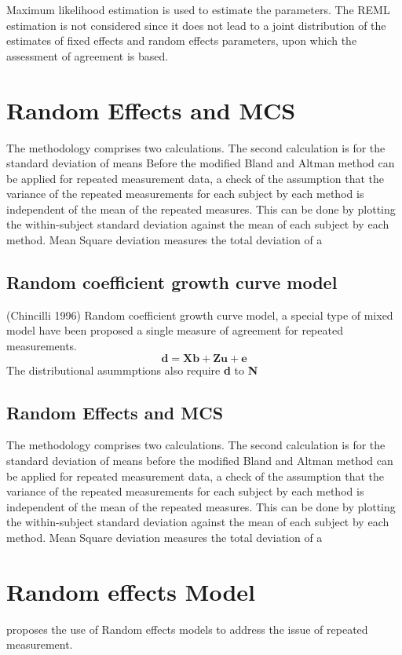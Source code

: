 \documentclass[12pt, a4paper]{report}
\theoremstyle{plain}
\theoremstyle{definition}
\theoremstyle{remark}
\begin{document}
Maximum likelihood estimation is used to estimate the parameters.
The REML estimation is not considered since it does not lead to a
joint distribution of the estimates of fixed effects and random
effects parameters, upon which the assessment of agreement is
based.

\section{Random Effects and MCS}
The methodology comprises two calculations. The second calculation
is for the standard deviation of means Before the modified Bland
and Altman method can be applied for repeated measurement data, a
check of the assumption that the variance of the repeated
measurements for each subject by each method is independent of the
mean of the repeated measures. This can be done by plotting the
within-subject standard deviation against the mean of each subject
by each method. Mean Square deviation measures the total deviation
of a


\subsection{Random coefficient growth curve model} (Chincilli
1996) Random coefficient growth curve model, a special type of
mixed model have been proposed a single measure of agreement for
repeated measurements.
\begin{equation}
\textbf{d}= \textbf{Xb} + \textbf{Zu} + \textbf{e}
\end{equation}
The distributional asummptions also require \textbf{d} to
\textbf{N}

\newpage
\subsection{Random Effects and MCS}
The methodology comprises two calculations. The second calculation
is for the standard deviation of means before the modified Bland
and Altman method can be applied for repeated measurement data, a check of the assumption that the variance of the repeated
measurements for each subject by each method is independent of the mean of the repeated measures. This can be done by plotting the
within-subject standard deviation against the mean of each subject by each method. Mean Square deviation measures the total deviation
of a

\section{Random effects Model} \citet{Myles} proposes the use of
Random effects models to address the issue of repeated
measurement. 
\end{document}
